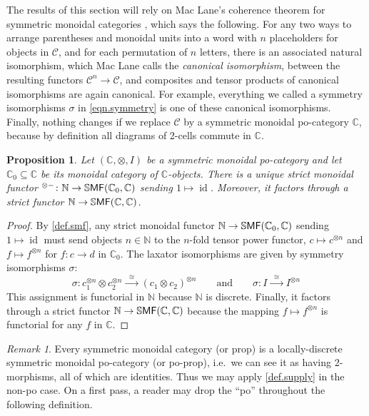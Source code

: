 \documentclass[11pt, oneside, article]{memoir}
\theoremstyle{plain}
\newtheorem{proposition}[theorem]{Proposition}
\theoremstyle{definition}
\theoremstyle{remark}
\newtheorem{remark}[theorem]{Remark}
\newcommand{\cat}[1]{\mathcal{#1}}%
\newcommand{\Cat}[1]{{\mathsf{#1}}}%
\newcommand{\CCat}[1]{\mathbb{\StrLeft{#1}{1}}\Cat{\StrGobbleLeft{#1}{1}}}%
\DeclareMathOperator{\id}{id}
\newcommand{\tpow}[1]{^{\otimes #1}}
\newcommand{\ssmf}{\CCat{SMF}}
\newcommand{\cc}{\mathbb{C}}
\newcommand{\nn}{\mathbb{N}}
\newcommand{\To}[1]{\xrightarrow{#1}}
\newcommand{\Too}[1]{\To{\;\;#1\;\;}}
\renewcommand{\ss}{\subseteq}
\newcommand{\qqand}{\qquad\text{and}\qquad}
\begin{document}
The results of this section will rely on Mac Lane's coherence theorem for symmetric monoidal categories \cite[Theorem XI.1]{maclane:1998a}, which says the following. For any two ways to arrange parentheses and monoidal units into a word with $n$ placeholders for objects in $\cat{C}$, and for each permutation of $n$ letters, there is an associated natural isomorphism, which Mac Lane calls the \emph{canonical isomorphism}, between the resulting functors $\cat{C}^n\to\cat{C}$, and composites and tensor products of canonical isomorphisms are again canonical. For example, everything we called a symmetry isomorphisms $\sigma$ in \cref{eqn.symmetry} is one of these canonical isomorphisms. Finally, nothing changes if we replace $\cat{C}$ by a symmetric monoidal po-category $\cc$, because by definition all diagrams of 2-cells commute in $\cc$.

\begin{proposition}\label{prop.homomorphically_supply_objects}
Let $(\cc,\otimes,I)$ be a symmetric monoidal po-category and let $\cc_0\ss\cc$ be its monoidal category of $\cc$-objects. There is a unique strict monoidal functor $\tpow{-}\colon\nn\to\ssmf(\cc_0,\cc)$ sending $1\mapsto\id$. Moreover, it factors through a strict functor $\nn\to\ssmf(\cc,\cc)$.
\end{proposition}
\begin{proof}
By \cref{def.smf}, any strict monoidal functor $\nn\to\ssmf(\cc_0,\cc)$ sending $1\mapsto\id$ must send objects $n\in\nn$ to the $n$-fold tensor power functor, $c\mapsto c\tpow{n}$  and $f\mapsto f\tpow{n}$ for $f\colon c\to d$ in $\cc_0$. The laxator isomorphisms are given by symmetry isomorphisms $\sigma$:
\begin{equation}\label{eqn.symmetry_c1c2}
  \sigma\colon 
  c_1\tpow{n}\otimes c_2\tpow{n}
  \Too{\cong}
  (c_1\otimes c_2)\tpow{n}
  \qqand
  \sigma\colon I\Too{\cong}I\tpow{n}
\end{equation}
This assignment is functorial in $\nn$ because $\nn$ is discrete. Finally, it factors through a strict functor $\nn\to\ssmf(\cc,\cc)$ because the mapping $f\mapsto f\tpow{n}$ is functorial for any $f$ in $\cc$.
\end{proof}

\begin{remark}
Every symmetric monoidal category (or prop) is a locally-discrete symmetric monoidal po-category (or po-prop), i.e.\ we can see it as having 2-morphisms, all of which are identities. Thus we may apply \cref{def.supply} in the non-po case. On a first pass, a reader may drop the ``po'' throughout the following definition.
\end{remark}
\end{document}
